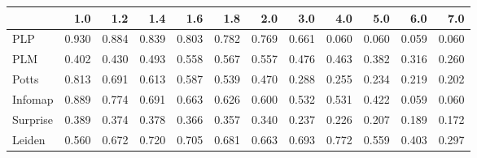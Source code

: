 \begin{tabular}{lrrrrrrrrrrr}
\toprule
{} &   1.0 &   1.2 &   1.4 &   1.6 &   1.8 &   2.0 &   3.0 &   4.0 &   5.0 &   6.0 &   7.0 \\
\midrule
PLP      & 0.930 & 0.884 & 0.839 & 0.803 & 0.782 & 0.769 & 0.661 & 0.060 & 0.060 & 0.059 & 0.060 \\
PLM      & 0.402 & 0.430 & 0.493 & 0.558 & 0.567 & 0.557 & 0.476 & 0.463 & 0.382 & 0.316 & 0.260 \\
Potts    & 0.813 & 0.691 & 0.613 & 0.587 & 0.539 & 0.470 & 0.288 & 0.255 & 0.234 & 0.219 & 0.202 \\
Infomap  & 0.889 & 0.774 & 0.691 & 0.663 & 0.626 & 0.600 & 0.532 & 0.531 & 0.422 & 0.059 & 0.060 \\
Surprise & 0.389 & 0.374 & 0.378 & 0.366 & 0.357 & 0.340 & 0.237 & 0.226 & 0.207 & 0.189 & 0.172 \\
Leiden   & 0.560 & 0.672 & 0.720 & 0.705 & 0.681 & 0.663 & 0.693 & 0.772 & 0.559 & 0.403 & 0.297 \\
\bottomrule
\end{tabular}
